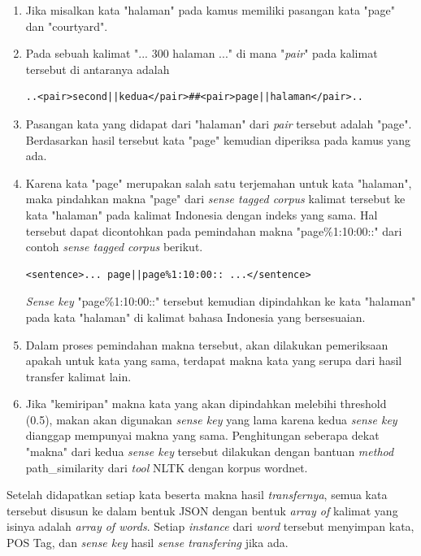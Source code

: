 \begin{enumerate}
	\item Jika misalkan kata "halaman" pada kamus memiliki pasangan kata "page" dan "courtyard".
	\item Pada sebuah kalimat "... 300 halaman ..." di mana "\textit{pair}" pada kalimat tersebut di antaranya adalah
	\begin{lstlisting}[backgroundcolor = \color{white}]
	..<pair>second||kedua</pair>##<pair>page||halaman</pair>..
	\end{lstlisting}
	\item Pasangan kata yang didapat dari "halaman" dari \textit{pair} tersebut adalah "page". Berdasarkan hasil tersebut kata "page" kemudian diperiksa pada kamus yang ada.
	\item Karena kata "page" merupakan salah satu terjemahan untuk kata "halaman", maka pindahkan makna "page" dari \textit{sense tagged corpus} kalimat tersebut ke kata "halaman" pada kalimat Indonesia dengan indeks yang sama. Hal tersebut dapat dicontohkan pada pemindahan makna "page\%1:10:00::" dari contoh \textit{sense tagged corpus} berikut.
	\begin{lstlisting}[backgroundcolor = \color{white}]
	<sentence>... page||page%1:10:00:: ...</sentence>
	\end{lstlisting}
	\textit{Sense key} "page\%1:10:00::" tersebut kemudian dipindahkan ke kata "halaman" pada kata "halaman" di kalimat bahasa Indonesia yang bersesuaian.
	\item Dalam proses pemindahan makna tersebut, akan dilakukan pemeriksaan apakah untuk kata yang sama, terdapat makna kata yang serupa dari hasil transfer kalimat lain.
	\item Jika "kemiripan" makna kata yang akan dipindahkan melebihi threshold (0.5), makan akan digunakan \textit{sense key} yang lama karena kedua \textit{sense key} dianggap mempunyai makna yang sama. Penghitungan seberapa dekat "makna" dari kedua \textit{sense key} tersebut dilakukan dengan bantuan \textit{method} path\_similarity dari \textit{tool} NLTK dengan korpus wordnet.
\end{enumerate}

Setelah didapatkan setiap kata beserta makna hasil \textit{transfernya}, semua kata tersebut disusun ke dalam bentuk JSON dengan bentuk \textit{array of} kalimat yang isinya adalah \textit{array of words}. Setiap \textit{instance} dari \textit{word} tersebut menyimpan kata, POS Tag, dan \textit{sense key} hasil \textit{sense transfering} jika ada.
